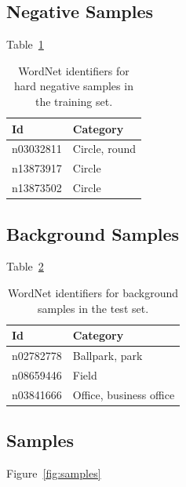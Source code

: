 \documentclass{llncs}
\begin{document}
{{		}

		\subsection{Negative Samples} {

			Table~\ref{tab:negative_samples}

			\begin{table}
				\centering
				\caption{WordNet identifiers for hard negative samples in the training set.}
				\label{tab:negative_samples}
				\begin{tabularx}{\textwidth}{lX}
					\toprule
					\textbf{Id} & \textbf{Category} \\
					\midrule
						n03032811 & Circle, round \\
						n13873917 & Circle \\
						n13873502 & Circle \\
					\bottomrule
				\end{tabularx}
			\end{table}

		}

		\subsection{Background Samples} {

			Table~\ref{tab:background_samples}

			\begin{table}
				\centering
				\caption{WordNet identifiers for background samples in the test set.}
				\label{tab:background_samples}
				\begin{tabularx}{\textwidth}{lX}
					\toprule
					\textbf{Id} & \textbf{Category} \\
					\midrule
						n02782778 & Ballpark, park \\
						n08659446 & Field \\
						n03841666 & Office, business office \\
					\bottomrule
				\end{tabularx}
			\end{table}

		}

		\subsection{Samples} {

			Figure~\ref{fig:samples}

			\newcommand{\samplefigurewidth}{0.45\textwidth}
			\newcommand{\samplewidth}{0.1\textwidth}
			\newcommand{\sampleheight}{1.5cm}
			\newcommand{\includesample}[1]{\hspace{0.1cm}\texttt{[image: images/training/\#1]}}
		
}}
\end{document}
